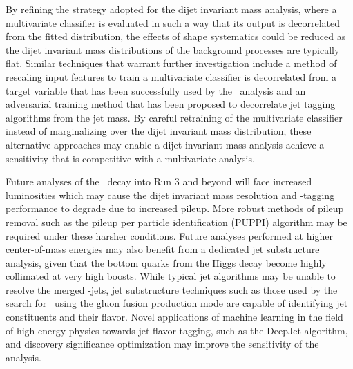 By refining the strategy adopted for the dijet invariant mass analysis, where a multivariate classifier is evaluated in such a way that its output is decorrelated from the fitted distribution, the effects of shape systematics could be reduced as the dijet invariant mass distributions of the background processes are typically flat. Similar techniques that warrant further investigation include a method of rescaling input features to train a multivariate classifier is decorrelated from a target variable that has been successfully used by the \Htomm\ analysis\cite{HTOMUMU} and an adversarial training method that has been proposed to decorrelate jet tagging algorithms from the jet mass\cite{ADVTRAIN}. By careful retraining of the multivariate classifier instead of marginalizing over the dijet invariant mass distribution, these alternative approaches may enable a dijet invariant mass analysis achieve a sensitivity that is competitive with a multivariate analysis.

Future analyses of the \VHbb\ decay into Run 3 and beyond will face increased luminosities which may cause the dijet invariant mass resolution and \qrkb-tagging performance to degrade due to increased pileup. More robust methods of pileup removal such as the pileup per particle identification (PUPPI)\cite{PUPPI} algorithm may be required under these harsher conditions. Future analyses performed at higher center-of-mass energies may also benefit from a dedicated jet substructure\cite{JETSUB} analysis, given that the bottom quarks from the Higgs decay become highly collimated at very high boosts. While typical jet algorithms may be unable to resolve the merged \qrkb-jets, jet substructure techniques such as those used by the search for \Htobb\ using the gluon fusion production mode\cite{ggHbb} are capable of identifying jet constituents and their flavor. Novel applications of machine learning in the field of high energy physics towards jet flavor tagging, such as the DeepJet\cite{DEEPJET} algorithm, and discovery significance optimization\cite{OPTSIG} may improve the sensitivity of the analysis.
